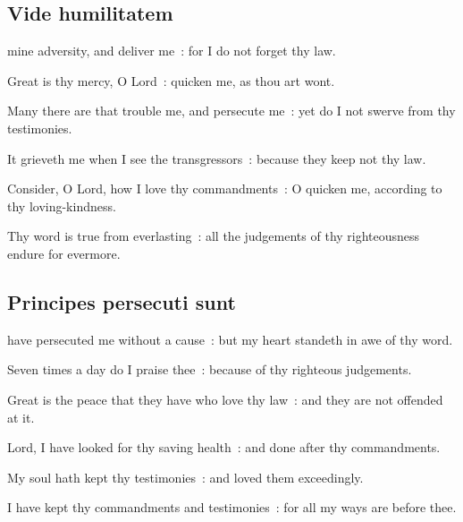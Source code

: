 \subsection{Vide humilitatem}


 mine adversity, and deliver me~: for I do not forget thy law.\par
{}
Great is thy mercy, O Lord~: quicken me, as thou art wont.\par
{}Many there are that trouble me, and persecute me~: yet do I not swerve from thy testimonies.\par
{}It grieveth me when I see the transgressors~: because they keep not thy law.\par
{}Consider, O Lord, how I love thy commandments~: O quicken me, according to thy loving-kindness.\par
{}Thy word is true from everlasting~: all the judgements of thy righteousness endure for evermore.\par

\subsection{Principes persecuti sunt}


 have persecuted me without a cause~: but my heart standeth in awe of thy word.\par
{}
Seven times a day do I praise thee~: because of thy righteous judgements.\par
{}Great is the peace that they have who love thy law~: and they are not offended at it.\par
{}Lord, I have looked for thy saving health~: and done after thy commandments.\par
{}My soul hath kept thy testimonies~: and loved them exceedingly.\par
{}I have kept thy commandments and testimonies~: for all my ways are before thee.\par


